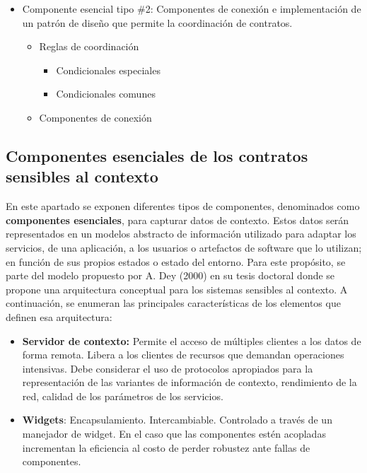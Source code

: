 \begin{itemize}
\begin{defi} [ContratoDHD]
\begin{itemize}
  \item Componente esencial tipo \#2: Componentes de conexión e implementación de un patrón de
diseño que permite la coordinación de contratos.
	    \begin{itemize}
	    \item Reglas de coordinación
		  
		  \begin{itemize}
		   \item Condicionales especiales
		   \item Condicionales comunes 
		  \end{itemize}
	    \item Componentes de conexión
	    \end{itemize}
\end{itemize}
\end{defi} 



\subsection{Componentes esenciales de los contratos sensibles al contexto}

En este apartado se exponen diferentes tipos de componentes, denominados como \textbf{componentes esenciales}, para capturar datos de contexto. Estos datos serán representados en un modelos abstracto de información  utilizado para adaptar los servicios, de una aplicación, a los usuarios o artefactos de software que lo utilizan; en función de sus propios estados o estado del entorno. Para este propósito, se parte del modelo propuesto por A. Dey (2000) en su tesis doctoral \cite{Dey} donde se propone una arquitectura conceptual para los sistemas sensibles  al contexto. A continuación, se enumeran las principales características de los elementos que definen esa arquitectura:


\begin{itemize}

\item \textbf {Servidor de contexto:} Permite el acceso de múltiples clientes a los datos de forma remota.  Libera a los clientes de recursos que demandan operaciones intensivas.  Debe considerar el uso de protocolos apropiados para la representación de las variantes de información de contexto, rendimiento de la red, calidad de los parámetros de los servicios.


\item \textbf{Widgets}:  Encapsulamiento.  Intercambiable.
Controlado a través de un manejador de widget. En el caso que las
componentes estén acopladas incrementan la eficiencia al costo de perder robustez ante fallas de componentes.



\end{itemize}
\end{itemize}
